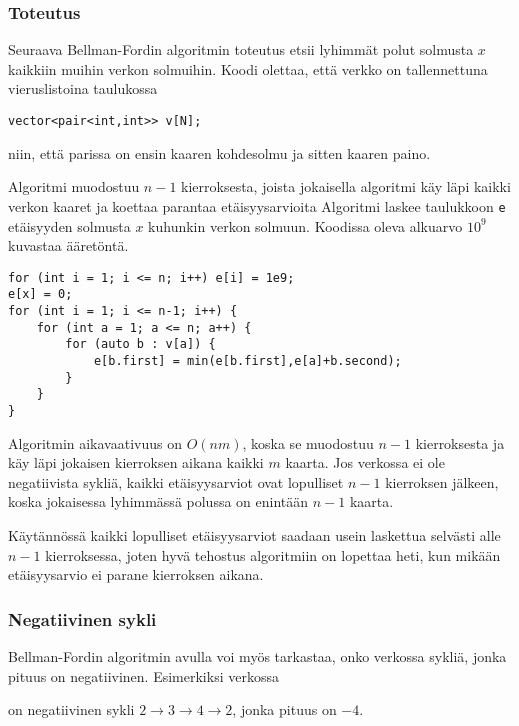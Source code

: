 \subsubsection{Toteutus}

Seuraava Bellman-Fordin algoritmin toteutus
etsii lyhimmät polut solmusta $x$
kaikkiin muihin verkon solmuihin.
Koodi olettaa, että verkko on tallennettuna
vieruslistoina taulukossa
\begin{lstlisting}
vector<pair<int,int>> v[N];
\end{lstlisting}
niin, että parissa on ensin kaaren kohdesolmu
ja sitten kaaren paino.

Algoritmi muodostuu $n-1$ kierroksesta,
joista jokaisella algoritmi käy läpi kaikki
verkon kaaret ja koettaa parantaa etäisyysarvioita
Algoritmi laskee taulukkoon \texttt{e}
etäisyyden solmusta $x$ kuhunkin verkon solmuun.
Koodissa oleva alkuarvo $10^9$ kuvastaa
ääretöntä.

\begin{lstlisting}
for (int i = 1; i <= n; i++) e[i] = 1e9;
e[x] = 0;
for (int i = 1; i <= n-1; i++) {
    for (int a = 1; a <= n; a++) {
        for (auto b : v[a]) {
            e[b.first] = min(e[b.first],e[a]+b.second);
        }
    }
}
\end{lstlisting}

Algoritmin aikavaativuus on $O(nm)$,
koska se muodostuu $n-1$ kierroksesta ja
käy läpi jokaisen kierroksen aikana kaikki $m$ kaarta.
Jos verkossa ei ole negatiivista sykliä,
kaikki etäisyysarviot ovat lopulliset $n-1$
kierroksen jälkeen, koska jokaisessa lyhimmässä
polussa on enintään $n-1$ kaarta.

Käytännössä kaikki lopulliset etäisyysarviot
saadaan usein laskettua selvästi alle $n-1$ kierroksessa,
joten hyvä tehostus algoritmiin on lopettaa heti,
kun mikään etäisyysarvio ei parane kierroksen aikana.

\subsubsection{Negatiivinen sykli}

Bellman-Fordin algoritmin avulla voi myös tarkastaa,
onko verkossa sykliä,
jonka pituus on negatiivinen.
Esimerkiksi verkossa

\begin{center}
\end{center}
\noindent
on negatiivinen sykli $2 \rightarrow 3 \rightarrow 4 \rightarrow 2$,
jonka pituus on $-4$.

